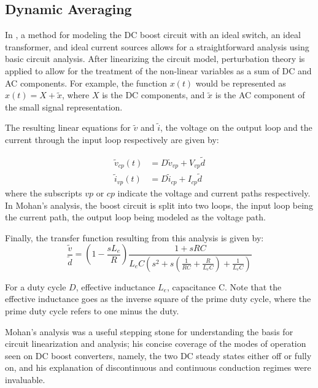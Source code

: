 \subsection{Dynamic Averaging}

In \cite{mohan}, a method for modeling the DC boost circuit with an ideal switch, an ideal transformer, and ideal current sources allows for a straightforward analysis using basic circuit analysis. After linearizing the circuit model, perturbation theory is applied to allow for the treatment of the non-linear variables as a sum of DC and AC components. For example, the function $x(t)$ would be represented as $x(t) = X + \tilde{x}$, where $X$ is the DC components, and $\tilde{x}$ is the AC component of the small signal representation. 

The resulting linear equations for $\tilde{v}$ and $\tilde{i}$, the voltage on the output loop and the current through the input loop respectively are given by: 

\begin{equation}
\begin{split}
\tilde{v}_{cp}(t) &= D\tilde{v}_{vp} + V_{vp}\tilde{d} \\
\tilde{i}_{vp}(t) &= D\tilde{i}_{cp} + I_{cp}\tilde{d}
\end{split}
\end{equation}
where the subscripts $vp$ or $cp$ indicate the voltage and current paths respectively. In Mohan's analysis, the boost circuit is split into two loops, the input loop being the current path, the output loop being modeled as the voltage path. 

Finally, the transfer function resulting from this analysis is given by:
\begin{equation}
\label{thirdOrder}
\frac{\tilde{v}}{\tilde{d}} = (1-\frac{sL_e}{R}) \frac{1 + sRC}{L_eC(s^2+s(\frac{1}{RC} + \frac{R}{L_eC}) + \frac{1}{L_eC})}
\end{equation} 

For a duty cycle $D$, effective inductance $L_e$, capacitance C. Note that the effective inductance goes as the inverse square of the prime duty cycle, where the prime duty cycle refers to one minus the duty. 

Mohan's analysis was a useful stepping stone for understanding the basis for circuit linearization and analysis; his concise coverage of the modes of operation seen on DC boost converters, namely, the two DC steady states either off or fully on, and his explanation of discontinuous and continuous conduction regimes were invaluable.

